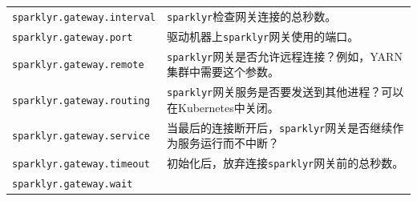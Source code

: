 \documentclass[
]{article}
\begin{document}
\begin{longtable}[]{@{}ll@{}}
\begin{minipage}[t]{0.47\columnwidth}
\texttt{sparklyr.gateway.interval}\strut
\end{minipage} & \begin{minipage}[t]{0.47\columnwidth}\raggedright
\texttt{sparklyr}检查网关连接的总秒数。\strut
\end{minipage}\tabularnewline
\begin{minipage}[t]{0.47\columnwidth}\raggedright
\texttt{sparklyr.gateway.port}\strut
\end{minipage} & \begin{minipage}[t]{0.47\columnwidth}\raggedright
驱动机器上\texttt{sparklyr}网关使用的端口。\strut
\end{minipage}\tabularnewline
\begin{minipage}[t]{0.47\columnwidth}\raggedright
\texttt{sparklyr.gateway.remote}\strut
\end{minipage} & \begin{minipage}[t]{0.47\columnwidth}\raggedright
\texttt{sparklyr}网关是否允许远程连接？例如，YARN集群中需要这个参数。\strut
\end{minipage}\tabularnewline
\begin{minipage}[t]{0.47\columnwidth}\raggedright
\texttt{sparklyr.gateway.routing}\strut
\end{minipage} & \begin{minipage}[t]{0.47\columnwidth}\raggedright
\texttt{sparklyr}网关服务是否要发送到其他进程？可以在Kubernetes中关闭。\strut
\end{minipage}\tabularnewline
\begin{minipage}[t]{0.47\columnwidth}\raggedright
\texttt{sparklyr.gateway.service}\strut
\end{minipage} & \begin{minipage}[t]{0.47\columnwidth}\raggedright
当最后的连接断开后，\texttt{sparklyr}网关是否继续作为服务运行而不中断？\strut
\end{minipage}\tabularnewline
\begin{minipage}[t]{0.47\columnwidth}\raggedright
\texttt{sparklyr.gateway.timeout}\strut
\end{minipage} & \begin{minipage}[t]{0.47\columnwidth}\raggedright
初始化后，放弃连接\texttt{sparklyr}网关前的总秒数。\strut
\end{minipage}\tabularnewline
\begin{minipage}[t]{0.47\columnwidth}\raggedright
\texttt{sparklyr.gateway.wait}\strut
\end{minipage} & \begin{minipage}[t]{0.47\columnwidth}\raggedright

\end{minipage}
\end{longtable}
\end{document}
